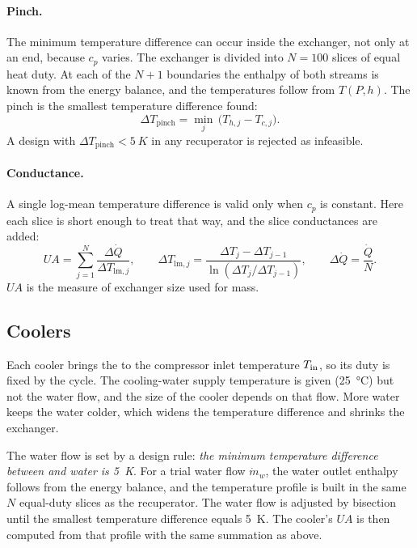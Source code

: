 \paragraph{Pinch.} The minimum temperature difference can occur inside the exchanger, not only at an end, because $c_p$ varies. The exchanger is divided into $N = 100$ slices of equal heat duty. At each of the $N+1$ boundaries the enthalpy of both streams is known from the energy balance, and the temperatures follow from $T(P,h)$. The pinch is the smallest temperature difference found:
\begin{equation}
\Delta T_\mathrm{pinch} = \min_{j}\,\big(T_{h,j} - T_{c,j}\big).
\end{equation}
A design with $\Delta T_\mathrm{pinch} < \SI{5}{K}$ in any recuperator is rejected as infeasible.

\paragraph{Conductance.} A single log-mean temperature difference is valid only when $c_p$ is constant. Here each slice is short enough to treat that way, and the slice conductances are added:
\begin{equation}
UA = \sum_{j=1}^{N} \frac{\Delta \dot Q}{\Delta T_{\mathrm{lm},j}}, \qquad
\Delta T_{\mathrm{lm},j} = \frac{\Delta T_j - \Delta T_{j-1}}{\ln\left(\Delta T_j/\Delta T_{j-1}\right)}, \qquad \Delta\dot Q = \frac{\dot Q}{N}.
\end{equation}
$UA$ is the measure of exchanger size used for mass.


\subsection{Coolers}\label{sec:cooler}
Each cooler brings the \cotwo{} to the compressor inlet temperature $T_\mathrm{in}$, so its duty is fixed by the cycle. The cooling-water supply temperature is given (\SI{25}{\celsius}) but not the water flow, and the size of the cooler depends on that flow. More water keeps the water colder, which widens the temperature difference and shrinks the exchanger.

The water flow is set by a design rule: \emph{the minimum temperature difference between \cotwo{} and water is \SI{5}{K}}. For a trial water flow $\dot m_w$, the water outlet enthalpy follows from the energy balance, and the temperature profile is built in the same $N$ equal-duty slices as the recuperator. The water flow is adjusted by bisection until the smallest temperature difference equals \SI{5}{K}. The cooler's $UA$ is then computed from that profile with the same summation as above.

